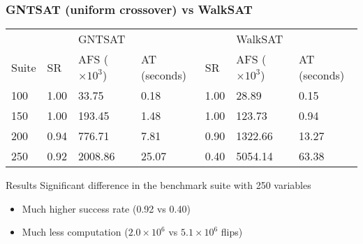 \begin{frame}
\frametitle{GNTSAT (uniform crossover) vs WalkSAT}
\begin{tabular}{l | l l l | l l l}
	\hline
	      &      & GNTSAT                     &                     &      & WalkSAT                    &                     \\
	Suite & SR   & AFS \tiny{($\times 10^3$)} & AT \tiny{(seconds)} & SR   & AFS \tiny{($\times 10^3$)} & AT \tiny{(seconds)} \\
	\hline
	100   & 1.00 & 33.75                      & 0.18                & 1.00 & 28.89                      & 0.15                \\
	150   & 1.00 & 193.45                     & 1.48                & 1.00 & 123.73                     & 0.94                \\
	200   & 0.94 & 776.71                     & 7.81                & 0.90 & 1322.66                    & 13.27               \\
	250   & 0.92 & 2008.86                    & 25.07               & 0.40 & 5054.14                    & 63.38
\end{tabular}

\begin{alertblock}{Results}
	Significant difference in the benchmark suite with 250
	variables
	\begin{itemize}
		\item Much higher success rate (0.92 vs 0.40)
		\item Much less computation ($2.0 \times 10^6$ vs $5.1 \times 10^6$ flips)
	\end{itemize}
\end{alertblock}
\end{frame}
